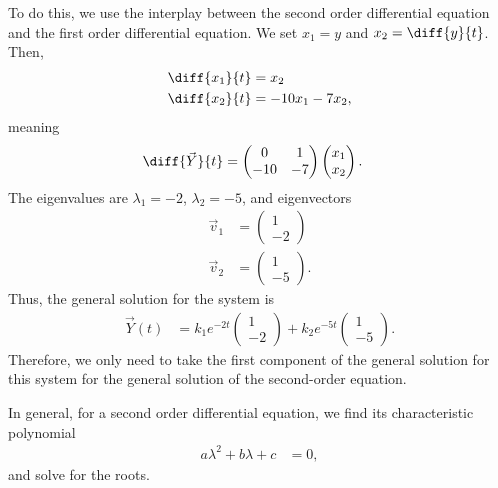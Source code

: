 \documentclass[10pt]{mypackage}
\begin{document}
\begin{example}
  To do this, we use the interplay between the second order differential equation and the first order differential equation. We set $x_1 = y$ and $x_2 = \diff{y}{t}$. Then,
  \begin{align*}
    \diff{x_1}{t} &= x_2\\
    \diff{x_2}{t} &= -10x_1-7x_2,
  \end{align*}
  meaning
  \begin{align*}
    \diff{\vec{Y}}{t} &= \begin{pmatrix}0 & 1 \\ -10 & -7\end{pmatrix} \begin{pmatrix}x_1\\x_2\end{pmatrix}.
  \end{align*}
  The eigenvalues are $\lambda_1 = -2$, $\lambda_2 = -5$, and eigenvectors
  \begin{align*}
    \vec{v}_1 &= \begin{pmatrix}1\\-2\end{pmatrix}\\
    \vec{v}_2 &= \begin{pmatrix}1\\-5\end{pmatrix}.
  \end{align*}
  Thus, the general solution for the system is
  \begin{align*}
    \vec{Y}(t) &= k_1e^{-2t} \begin{pmatrix}1\\-2\end{pmatrix} + k_2e^{-5t} \begin{pmatrix}1\\-5\end{pmatrix}.
  \end{align*}
  Therefore, we only need to take the first component of the general solution for this system for the general solution of the second-order equation.
\end{example}
In general, for a second order differential equation, we find its characteristic polynomial
\begin{align*}
  a\lambda^2 + b\lambda + c &= 0,
\end{align*}
and solve for the roots.
\end{document}
